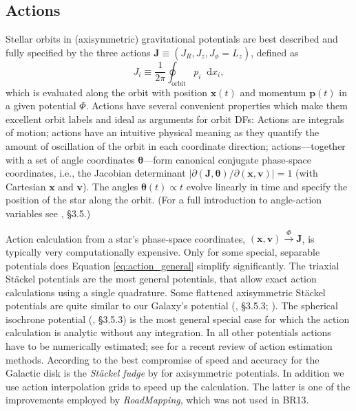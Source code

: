 \documentclass[iop,revtex4,numberedappendix,appendixfloats]{emulateapj}
\newcommand{\vect}[1]{\boldsymbol{#1}}
\newcommand*\diff{\mathop{}\!\mathrm{d}}
\newcommand{\RM}{{\sl RoadMapping}}
\begin{document}
\subsection{Actions}

Stellar orbits in (axisymmetric) gravitational potentials are best described and fully specified by the three actions $\vect{J} \equiv (J_R, J_z, J_\phi=L_z)$, defined as
\begin{equation}
J_i \equiv \frac{1}{2\pi} \oint_\text{orbit} p_i \diff x_i, \label{eq:action_general}
\end{equation}
which is evaluated along the orbit with position $\vect{x}(t)$ and momentum $\vect{p}(t)$ in a given potential $\Phi$. Actions have several convenient properties which make them excellent orbit labels and ideal as arguments for orbit DFs: Actions are integrals of motion; actions have an intuitive physical meaning as they quantify the amount of oscillation of the orbit in each coordinate direction; actions---together with a set of angle coordinates $\vect{\theta}$---form canonical conjugate phase-space coordinates, i.e., the Jacobian determinant $\left| \partial(\vect{J},\vect{\theta}) / \partial (\vect{x},\vect{v}) \right|=1$ (with Cartesian $\vect{x}$ and $\vect{v}$). The angles $\vect{\theta}(t)\propto t$ evolve linearly in time and specify the position of the star along the orbit. (For a full introduction to angle-action variables see \citealt{2008gady.book.....B}, \S 3.5.)

Action calculation from a star's phase-space coordinates, $(\vect{x},\vect{v}) \stackrel{\Phi}{\longrightarrow} \vect{J}$, is typically very computationally expensive. Only for some special, separable potentials does Equation \eqref{eq:action_general} simplify significantly. The triaxial St\"{a}ckel potentials \citep{1985MNRAS.216..273D} are the most general potentials, that allow exact action calculations using a single quadrature. Some flattened axisymmetric St\"{a}ckel potentials are quite similar to our Galaxy's potential (\citealt{2008gady.book.....B}, \S 3.5.3; \citealt{1994AA...287...43B,2003MNRAS.340..752F}). The spherical isochrone potential (\citealt{1959AnAp...22..126H,2008gady.book.....B}, \S 3.5.3) is the most general special case for which the action calculation is analytic without any integration. In all other potentials actions have to be numerically estimated; see \citet{2016MNRAS.457.2107S} for a recent review of action estimation methods. According to \citet{2016MNRAS.457.2107S} the best compromise of speed and accuracy for the Galactic disk is the \emph{St\"{a}ckel fudge} by \citet{2012MNRAS.426.1324B} for axisymmetric potentials. In addition we use action interpolation grids \citep{2012MNRAS.426.1324B,2015ApJS..216...29B} to speed up the calculation. The latter is one of the improvements employed by \RM{}, which was not used in BR13. 
\end{document}

